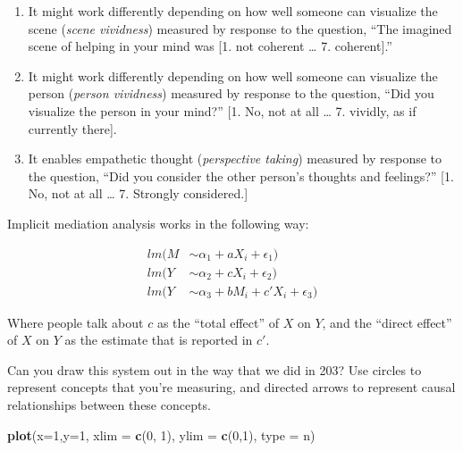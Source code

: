\documentclass[
]{article}
\newenvironment{Shaded}{\begin{snugshade}}{\end{snugshade}}
\newcommand{\AttributeTok}[1]{\textcolor[rgb]{0.13,0.29,0.53}{#1}}
\newcommand{\DecValTok}[1]{\textcolor[rgb]{0.00,0.00,0.81}{#1}}
\newcommand{\FunctionTok}[1]{\textcolor[rgb]{0.13,0.29,0.53}{\textbf{#1}}}
\newcommand{\NormalTok}[1]{#1}
\newcommand{\StringTok}[1]{\textcolor[rgb]{0.31,0.60,0.02}{#1}}
\providecommand{\tightlist}{%
  \setlength{\itemsep}{0pt}\setlength{\parskip}{0pt}}
\theoremstyle{definition}
\theoremstyle{definition}
\theoremstyle{definition}
\theoremstyle{definition}
\theoremstyle{remark}
\begin{document}
\begin{enumerate}
\def\labelenumi{\arabic{enumi}.}
\tightlist
\item
  It might work differently depending on how well someone can visualize the scene (\emph{scene vividness}) measured by response to the question, ``The imagined scene of helping in your mind was {[}1. not coherent \ldots{} 7. coherent{]}.''
\item
  It might work differently depending on how well someone can visualize the person (\emph{person vividness}) measured by response to the question, ``Did you visualize the person in your mind?'' {[}1. No, not at all \ldots{} 7. vividly, as if currently there{]}.
\item
  It enables empathetic thought (\emph{perspective taking}) measured by response to the question, ``Did you consider the other person's thoughts and feelings?'' {[}1. No, not at all \ldots{} 7. Strongly considered.{]}
\end{enumerate}

Implicit mediation analysis works in the following way:

\[
  \begin{aligned}
    lm(M &\sim \alpha_{1} + aX_{i} + \epsilon_{1}) \\ 
    lm(Y &\sim \alpha_{2} + cX_{i} + \epsilon_{2}) \\ 
    lm(Y &\sim \alpha_{3} + bM_{i} + c'X_{i} + \epsilon_{3})
  \end{aligned}
\]

Where people talk about \(c\) as the ``total effect'' of \(X\) on \(Y\), and the ``direct effect'' of \(X\) on \(Y\) as the estimate that is reported in \(c'\).

Can you draw this system out in the way that we did in 203? Use circles to represent concepts that you're measuring, and directed arrows to represent causal relationships between these concepts.

\begin{Shaded}
\begin{Highlighting}[]
\FunctionTok{plot}\NormalTok{(}\AttributeTok{x=}\DecValTok{1}\NormalTok{,}\AttributeTok{y=}\DecValTok{1}\NormalTok{, }\AttributeTok{xlim =} \FunctionTok{c}\NormalTok{(}\DecValTok{0}\NormalTok{, }\DecValTok{1}\NormalTok{), }\AttributeTok{ylim =} \FunctionTok{c}\NormalTok{(}\DecValTok{0}\NormalTok{,}\DecValTok{1}\NormalTok{), }\AttributeTok{type =} \StringTok{\textquotesingle{}n\textquotesingle{}}\NormalTok{)}
\end{Highlighting}
\end{Shaded}
\end{document}
